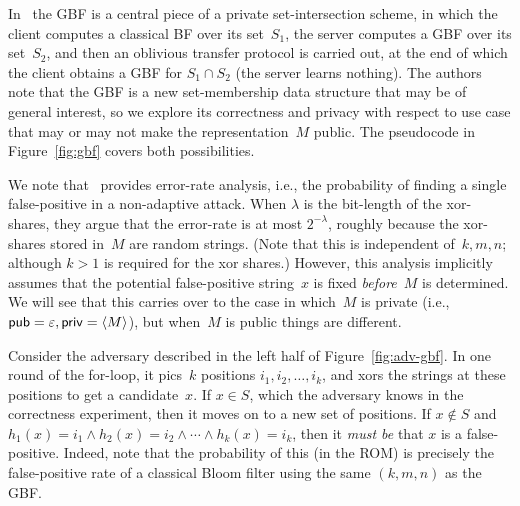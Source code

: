 In~\cite{CCS:DonCheWen13} the GBF is a central piece of a private
set-intersection scheme, in which the client computes a classical BF
over its set~$S_1$, the server computes a GBF over its set~$S_2$,
and then an oblivious transfer protocol is carried out, at the end
of which the client obtains a GBF for $S_1 \cap S_2$ (the server
learns nothing). The authors note that the GBF is a new
set-membership data structure that may be of general interest, so we
explore its correctness and privacy with respect to use case that
may or may not make the representation~$M$ public. The pseudocode in
Figure~\ref{fig:gbf} covers both possibilities.

 We note that~\cite{CCS:DonCheWen13} provides
error-rate analysis, i.e., the probability of finding a single
false-positive in a non-adaptive attack.  When $\lambda$ is the
bit-length of the xor-shares, they argue that the error-rate is at
most $2^{-\lambda}$, roughly because the xor-shares stored in~$M$
are random strings.  (Note that
  this is independent of~$k,m,n$; although $k>1$ is required for the
  xor shares.)  However, this analysis implicitly assumes that the potential false-positive string~$x$ is fixed
\emph{before}~$M$ is determined.  We will see that this carries over
 to the case in which~$M$ is private (i.e.,
${\sf pub}=\varepsilon,{\sf priv}=\langle M \rangle$), but when~$M$ is
public things are different.

Consider the adversary described in the left half of
Figure~\ref{fig:adv-gbf}.  In one round of the for-loop, it pics~$k$
positions $i_1,i_2,\ldots,i_k$, and xors the strings at these
positions to get a candidate~$x$.   If $x \in S$, which the
adversary knows in the correctness experiment, then it moves on to a
new set of positions.  If $x \not\in S$ and $h_{1}(x)=i_1 \wedge
h_2(x)=i_2 \wedge \cdots \wedge h_k(x) = i_k$, then it \emph{must
be} that $x$ is a false-positive.   Indeed, note that the
probability of this (in the ROM) is precisely the false-positive
rate of a classical Bloom filter using the same $(k,m,n)$ as the
GBF.

